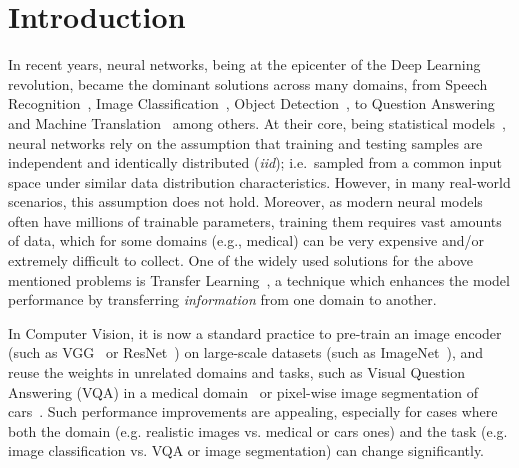 \section{Introduction}
In recent years, neural networks, being at the epicenter of the Deep Learning~\cite{lecun2015deep} revolution, became the dominant solutions across many domains, from Speech Recognition~\cite{graves2013speech}, Image Classification~\cite{krizhevsky2012imagenet}, Object Detection~\cite{redmon2016you}, to Question Answering~\cite{weston2014memory} and Machine Translation~\cite{bahdanau2014neural} among others.
At their core, being statistical models~\cite{ripley1993statistical,warner1996understanding}, neural networks rely on the assumption that training and testing samples are independent and identically distributed (\textit{iid}); i.e.\ sampled from a common input space under similar data distribution characteristics.
However, in many real-world scenarios, this assumption does not hold. Moreover, as modern neural models often have millions of trainable parameters, training them requires vast amounts of data, which for some domains (e.g., medical) can be very expensive and/or extremely difficult to collect.
One of the widely used solutions for the above mentioned problems is Transfer Learning~\cite{pan2009survey,weiss2016survey}, a technique which enhances the  model performance by transferring \emph{information} from one domain to another.


In Computer Vision, it is now a standard practice to pre-train an image encoder (such as VGG~\cite{simonyan2014very} or ResNet~\cite{he2016deep}) on large-scale datasets (such as ImageNet~\cite{deng2009imagenet}), and reuse the weights in unrelated domains and tasks, such as Visual Question Answering (VQA) in a medical domain~\cite{kornuta2019leveraging} or pixel-wise image segmentation of cars~\cite{iglovikov2018ternausnet}.
Such performance improvements are appealing, especially for cases where both the domain (e.g. realistic images vs. medical or cars ones) and the task (e.g. image classification vs. VQA or image segmentation) can change significantly. %

